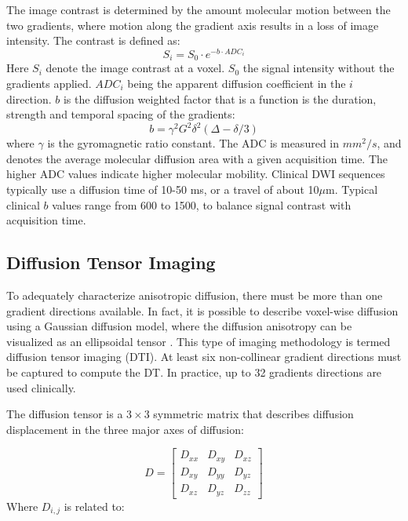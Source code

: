 The image contrast is determined by the amount molecular motion between the two gradients, where motion along the gradient axis results in a loss of image intensity. The contrast is defined as: 
\begin{equation}
S_i = S_0 \cdot e^{-b \cdot ADC_i}
\end{equation}
Here $S_i$ denote the image contrast at a voxel. $S_0$ the signal intensity without the gradients applied. $ADC_i$ being the apparent diffusion coefficient in the $i$ direction. $b$ is the diffusion weighted factor that is a function is the duration, strength and temporal spacing of the gradients: 
\begin{equation}
b = \gamma^2 G^2 \delta^2(\Delta - \delta/3)
\end{equation}
where $\gamma$ is the gyromagnetic ratio constant. The ADC is measured in $mm^2/s$, and denotes the average molecular diffusion area with a given acquisition time. The higher ADC values indicate higher molecular mobility. Clinical DWI sequences typically use a diffusion time of 10-50 ms, or a travel of about 10$\mu$m. Typical clinical $b$ values range from 600 to 1500, to balance signal contrast with acquisition time. 

\subsection{Diffusion Tensor Imaging}

To adequately characterize anisotropic diffusion, there must be more than one gradient directions available. In fact, it is possible to describe voxel-wise diffusion using a Gaussian diffusion model, where the diffusion anisotropy can be visualized as an ellipsoidal tensor \cite{Jones2002}. This type of imaging methodology is termed diffusion tensor imaging (DTI). At least six non-collinear gradient directions must be captured to compute the DT. In practice, up to 32 gradients directions are used clinically.

The diffusion tensor is a $3 \times 3$ symmetric matrix that describes diffusion displacement in the three major axes of diffusion: 

\begin{equation}
D=
\begin{bmatrix}
    D_{xx} & D_{xy} & D_{xz} \\
    D_{xy} & D_{yy} & D_{yz} \\
    D_{xz} & D_{yz} & D_{zz}
\end{bmatrix}
\end{equation}
Where $D_{i,j}$ is related to:

